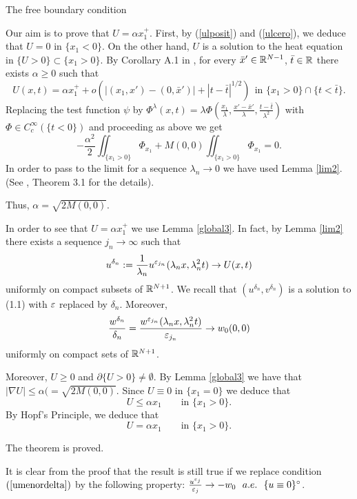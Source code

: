 \begin{section}{The free boundary condition}
\begin{pf}
Our aim is to prove that $U=\alpha x_1^+$. First, by (\ref{ulposit}) and
(\ref{ulcero}), we deduce that $U=0$ in $\{x_1<0\}$. On the other hand,
$U$ is a solution to the heat equation in $\{U>0\}\subset\{x_1>0\}$. By
Corollary A.1 in \cite{CLW1}, for every $\bar x'\in {\Bbb R}^{N-1}$, $\bar t\in {\Bbb R}$ there
exists $\alpha\ge0$ such that
$$
U(x,t)=\alpha x_1^++o(|(x_1,x')-(0,\bar x')|+|t-\bar t|^{1/2})\ \ \mbox{in }
\{x_1>0\}\cap\{t<\bar t\}.
$$
Replacing  the test function $\psi$ by $\Phi^\lambda(x,t)= \lambda \Phi
(\frac{x_1}\lambda,\frac{x'-\bar x'}\lambda,\frac{t-\bar t}{\lambda^2})$
with $\Phi\in C^\infty_c(\{t<0\})$ and proceeding as above we get
\begin{equation}
\label{eqalpha}
-\frac{\alpha^2}2\iint_{\{x_1>0\}}\Phi_{x_1}+M(0,0)\iint_{\{x_1>0\}} \Phi_{x_1}=0.
\end{equation}
In order to pass to the limit for a sequence $\lambda_n\to0$ we have used
Lemma \ref{lim2}. (See \cite{CLW2}, Theorem 3.1 for the details).

Thus, $\alpha=\sqrt{2M(0,0)}$.

In order to see that $U=\alpha x_1^+$ we use Lemma \ref{global3}. In fact,
by  Lemma \ref{lim2} there exists a sequence $j_n\to\infty$ such that
$$
u^{\delta_n}:=\frac 1{\lambda_n}u^{\varepsilon_{j_n}}(\lambda_n x,\lambda_n^2 t)\to U(x,t)
$$
uniformly on compact subsets of ${\Bbb R}^{N+1}$. We recall that $(u^{\delta_n},v^
{\delta_n})$ is a solution to (1.1) with $\varepsilon$ replaced by $\delta_n$.
Moreover,
$$
\frac{w^{\delta_n}}{\delta_n}=\frac{w^{\varepsilon_{j_n}}(\lambda_n x,\lambda_n^2 t)}{{\varepsilon_{j_n}}}
\to w_0(0,0)
$$
uniformly on compact sets of ${\Bbb R}^{N+1}$.

Moreover, $U\ge0$ and $\partial\{U>0\}\neq\emptyset$. By Lemma \ref{global3}
we have that $|\nabla U|\le \alpha(=\sqrt{2M(0,0)}$. Since $U\equiv0$
in $\{x_1=0\}$ we deduce that
$$
U\le\alpha x_1\qquad\mbox{in }\{x_1>0\}.
$$
By Hopf's Principle, we deduce that
$$
U=\alpha x_1 \qquad\mbox{in }\{x_1>0\}.
$$

The theorem is proved.
\end{pf}

\medskip

\begin{rem}
It is clear from the proof that the result is still true if we replace
condition $(\ref{umenordelta})$ by the following property: $\frac{u^{\varepsilon_j}}{{\varepsilon_j}}
\to -w_0\ \ a.e.\ \ \{u\equiv0\}^\circ$.
\end{rem}

\end{section}

